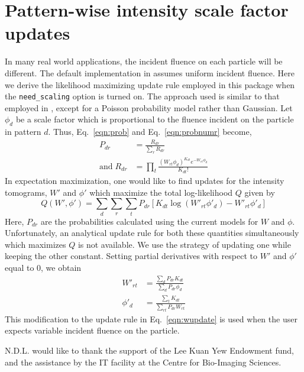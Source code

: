 \documentclass[preprint]{iucr}              %
\begin{document}
\section{Pattern-wise intensity scale factor updates}\label{sec:rescaling}
In many real world applications, the incident fluence on each particle will be different. The default implementation in  assumes uniform incident fluence. Here we derive the likelihood maximizing update rule employed in this package when the \texttt{need\_scaling} option is turned on. The approach used is similar to that employed in , except for a Poisson probability model rather than Gaussian. Let $\phi_d$ be a scale factor which is proportional to the fluence incident on the particle in pattern $d$. Thus, Eq.~\ref{eqn:prob} and Eq.~\ref{eqn:probnumr} become,
\begin{align}
P_{dr} &= \frac{R_{dr}}{\sum\limits_r R_{dr}} \\
\mathrm{and }\;R_{dr} &= \prod_t \frac{(W_{rt}\phi_d)^{K_{dt}} e^{-W_{rt}\phi_d}}{K_{dt}!}
\end{align}
In expectation maximization, one would like to find updates for the intensity tomograms, $W'$ and $\phi'$ which maximize the total log-likelihood $Q$ given by
\[Q(W', \phi') = \sum_d \sum_r \sum_t P_{dr} \left[K_{dt}\log(W'_{rt} \phi'_d) - W'_{rt} \phi'_d\right]\]
Here, $P_{dr}$ are the probabilities calculated using the current models for $W$ and $\phi$. Unfortunately, an analytical update rule for both these quantities simultaneously which maximizes $Q$ is not available. We use the strategy of updating one while keeping the other constant. Setting partial derivatives with respect to $W'$ and $\phi'$ equal to 0, we obtain
\begin{align}
W'_{rt} &= \frac{\sum\limits_d P_{dr} K_{dt}}{\sum\limits_d P_{dr} \phi_d} \\
\phi'_d &= \frac{\sum\limits_t K_{dt}}{\sum\limits_{rt} P_{dr} W_{rt}}
\end{align}
This modification to the update rule in Eq.~\ref{eqn:wupdate} is used when the user expects variable incident fluence on the particle.



N.D.L. would like to thank the support of the Lee Kuan Yew Endowment fund, and the assistance by the IT facility at the Centre for Bio-Imaging Sciences.
\end{document}
